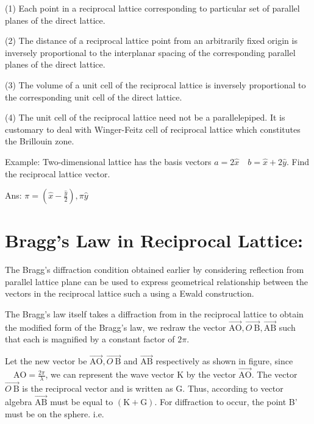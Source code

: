 (1) Each point in a reciprocal lattice corresponding to particular set of parallel planes of the direct lattice.

(2) The distance of a reciprocal lattice point from an arbitrarily fixed origin is inversely proportional to the interplanar spacing of the corresponding parallel planes of the direct lattice.

(3) The volume of a unit cell of the reciprocal lattice is inversely proportional to the corresponding unit cell of the direct lattice.

(4) The unit cell of the reciprocal lattice need not be a parallelepiped. It is customary to deal with Winger-Feitz cell of reciprocal lattice which constitutes the Brillouin zone.

Example: Two-dimensional lattice has the basis vectors $a=2 \hat{x} \quad b=\hat{x}+2 \hat{y}$. Find the reciprocal lattice vector.

Ans: $\pi=\left(\hat{x}-\frac{\hat{y}}{2}\right), \pi \hat{y}$

\section{Bragg's Law in Reciprocal Lattice:}

The Bragg's diffraction condition obtained earlier by considering reflection from parallel lattice plane can be used to express geometrical relationship between the vectors in the reciprocal lattice such a using a Ewald construction.



The Bragg's law itself takes a diffraction from in the reciprocal lattice to obtain the modified form of the Bragg's law, we redraw the vector $\overrightarrow{\mathrm{AO}}, \overrightarrow{O \mathrm{~B}}, \overrightarrow{\mathrm{AB}}$ such that each is magnified by a constant factor of $2 \pi$. 



Let the new vector be $\overrightarrow{\mathrm{AO}}, \overrightarrow{O \mathrm{~B}}$ and $\overrightarrow{\mathrm{AB}}$ respectively as shown in figure, since $\quad \mathrm{AO}=\frac{2 \pi}{\lambda}$, we can represent the wave vector $\mathrm{K}$ by the vector $\overrightarrow{\mathrm{AO}}$. The vector $\overrightarrow{O \mathrm{~B}}$ is the reciprocal vector and is written as $\mathrm{G}$. Thus, according to vector algebra $\overrightarrow{\mathrm{AB}}$ must be equal to $(\mathrm{K}+\mathrm{G})$. For diffraction to occur, the point B' must be on the sphere. i.e.

